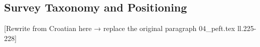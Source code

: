 \subsection{Survey Taxonomy and Positioning}
\label{sec:peft:positioning_reframe}

[Rewrite from Croatian here → replace the original paragraph 04_peft.tex ll.225-228]


%
%
%
%

